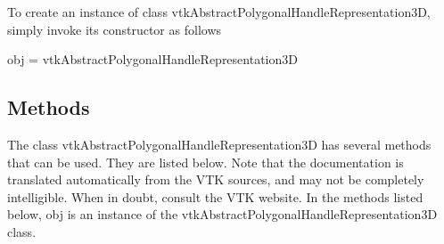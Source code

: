 To create an instance of class vtk\-Abstract\-Polygonal\-Handle\-Representation3\-D, simply invoke its constructor as follows \begin{DoxyVerb}  obj = vtkAbstractPolygonalHandleRepresentation3D
\end{DoxyVerb}
 \hypertarget{vtkwidgets_vtkxyplotwidget_Methods}{}\subsection{Methods}\label{vtkwidgets_vtkxyplotwidget_Methods}
The class vtk\-Abstract\-Polygonal\-Handle\-Representation3\-D has several methods that can be used. They are listed below. Note that the documentation is translated automatically from the V\-T\-K sources, and may not be completely intelligible. When in doubt, consult the V\-T\-K website. In the methods listed below, {\ttfamily obj} is an instance of the vtk\-Abstract\-Polygonal\-Handle\-Representation3\-D class. 
